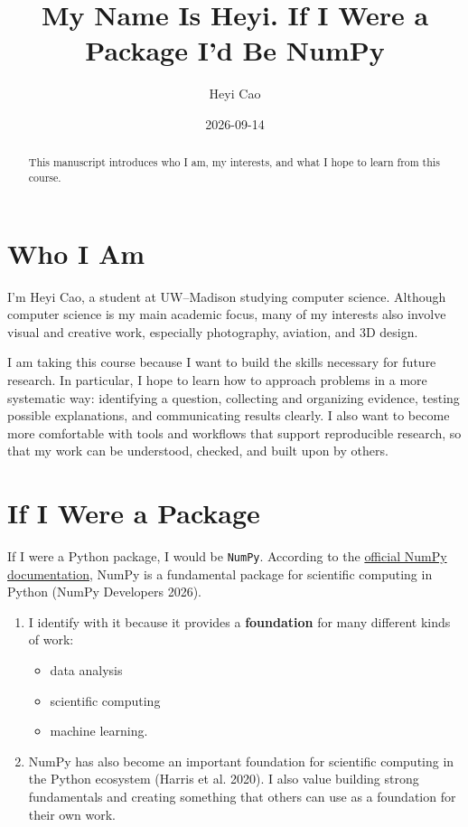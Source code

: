 \documentclass[
  letterpaper,
  DIV=11,
  numbers=noendperiod]{scrartcl}
\title{My Name Is Heyi. If I Were a Package I'd Be NumPy}
\author{Heyi Cao}
\date{2026-09-14}
\providecommand{\tightlist}{%
  \setlength{\itemsep}{0pt}\setlength{\parskip}{0pt}}
\renewcommand*\contentsname{Table of contents}
\newcommand\contentsname{Table of contents}
\begin{document}
\maketitle
\begin{abstract}
This manuscript introduces who I am, my interests, and what I hope to
learn from this course.
\end{abstract}

\renewcommand*\contentsname{Table of contents}
{
\setcounter{tocdepth}{3}
\tableofcontents
}

\section{Who I Am}\label{who-i-am}

I'm Heyi Cao, a student at UW--Madison studying computer science.
Although computer science is my main academic focus, many of my
interests also involve visual and creative work, especially photography,
aviation, and 3D design.

I am taking this course because I want to build the skills necessary for
future research. In particular, I hope to learn how to approach problems
in a more systematic way: identifying a question, collecting and
organizing evidence, testing possible explanations, and communicating
results clearly. I also want to become more comfortable with tools and
workflows that support reproducible research, so that my work can be
understood, checked, and built upon by others.

\section{If I Were a Package}\label{if-i-were-a-package}

If I were a Python package, I would be \texttt{NumPy}. According to the
\href{https://numpy.org/doc/stable/}{official NumPy documentation},
NumPy is a fundamental package for scientific computing in Python (NumPy
Developers 2026).

\begin{enumerate}
\def\labelenumi{\arabic{enumi}.}
\tightlist
\item
  I identify with it because it provides a \textbf{foundation} for many
  different kinds of work:

  \begin{itemize}
  \tightlist
  \item
    data analysis
  \item
    scientific computing
  \item
    machine learning.
  \end{itemize}
\item
  NumPy has also become an important foundation for scientific computing
  in the Python ecosystem ({Harris et al.} 2020). I also value building
  strong fundamentals and creating something that others can use as a
  foundation for their own work.
\end{enumerate}
\end{document}
